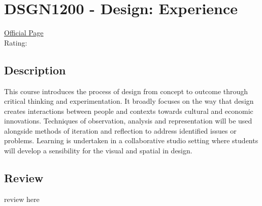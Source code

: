 \hypertarget{DSGN1200}{\section{DSGN1200 - Design: Experience}}

\large
\textcolor{turbo_purple}{\href{https://my.uq.edu.au/programs-courses/course.html?course_code=DSGN1200}{Official Page}} \\
Rating: \cstar\cstar\cstar\cstar\ostar

\normalsize
\subsection*{Description}
This course introduces the process of design from concept to outcome through critical thinking and experimentation.
It broadly focuses on the way that design creates interactions between people and contexts towards cultural and economic innovations.
Techniques of observation, analysis and representation will be used alongside methods of iteration and reflection to address identified issues or problems.
Learning is undertaken in a collaborative studio setting where students will develop a sensibility for the visual and spatial in design.

\subsection*{Review}
review here
